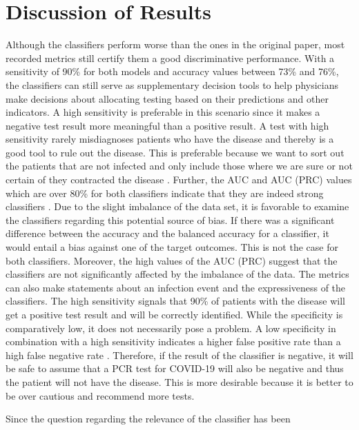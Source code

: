 \section{Discussion of Results}
Although the classifiers perform worse than the ones in the original paper, 
most recorded metrics still certify them a good discriminative performance.
With a sensitivity of 90\% for both models and accuracy values between 73\% and 
76\%, the classifiers can still serve as supplementary decision tools to help 
physicians make decisions about allocating testing based on their predictions 
and other indicators. 
A high sensitivity is preferable in this scenario since it makes a negative test 
result more meaningful than a positive result. A test with high sensitivity 
rarely misdiagnoses patients who have the disease and thereby is a good tool to 
rule out the disease. This is preferable because we want to sort out the 
patients that are not infected and only include those where we are sure or not 
certain of they contracted the disease \cite{RN168}.
Further, the AUC and AUC (PRC) values which are over 80\% 
for both classifiers indicate that they are indeed strong classifiers 
\cite{RN167}.
Due to the slight imbalance of the data set, it is  favorable to examine the 
classifiers regarding this potential source of bias. If there was a significant 
difference between the accuracy and the balanced accuracy for a classifier, it 
would entail a bias against one of the target outcomes. This is not the case 
for both classifiers. Moreover, the high values of the AUC (PRC) suggest that 
the classifiers are not significantly affected by the imbalance of the data.
The metrics can also make statements about an infection event and the 
expressiveness of the classifiers. The high sensitivity signals that 90\% of 
patients with the disease will get a positive test result and will be correctly 
identified. 
While the specificity is comparatively low, it does not necessarily pose a 
problem. A low specificity in combination with a high sensitivity indicates a 
higher false positive rate than a high false negative rate \cite{RN168}.
Therefore, if the result of the classifier is negative, it will be safe to 
assume that a PCR test for COVID-19 will also be negative and thus the patient 
will not have the disease.
This is more desirable because it is better to be over cautious and recommend 
more tests.
\par
Since the question regarding the relevance of the classifier has been 
